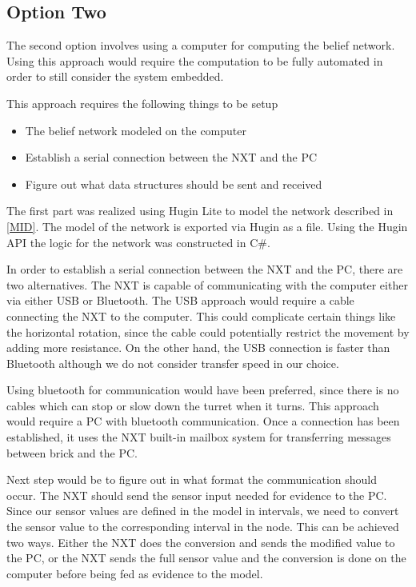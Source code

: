 \subsection{Option Two}
The second option involves using a computer for computing the
belief network. Using this approach would require the computation to be fully
automated in order to still consider the system embedded.\nl

This approach requires the following things to be setup
\begin{itemize}
\item The belief network modeled on the computer
\item Establish a serial connection between the NXT and the PC
\item Figure out what data structures should be sent and received
\end{itemize}

The first part was realized using Hugin Lite to model the network described
in \autoref{MID}. The model of the network is exported via Hugin as a file.
Using the Hugin API the logic for the network was constructed in C\#.\nl

In order to establish a serial connection between the NXT and the PC, there are
two alternatives. The NXT is capable of communicating with the computer either
via either USB or Bluetooth. The USB approach would require a cable connecting
the NXT to the computer.
This could complicate certain things like the horizontal rotation, since the
cable could potentially restrict the movement by adding more resistance.
On the other hand, the USB connection is faster than Bluetooth although we do not consider transfer speed in our choice.\nl

Using bluetooth for communication would have been preferred, since there is
no cables which can stop or slow down the turret when it turns.
This approach would require a PC with bluetooth communication. Once a connection has
been established, it uses the NXT built-in mailbox system for transferring
messages between brick and the PC.\nl

Next step would be to figure out in what format the communication should occur.
The NXT should send the sensor input needed for evidence to the PC. Since our
sensor values are defined in the model in intervals, we need to convert the
sensor value to the corresponding interval in the node. This can be achieved two ways. Either
the NXT does the conversion and sends the modified value to the PC, or the NXT
sends the full sensor value and the conversion is done on the computer before
being fed as evidence to the model.\nl

